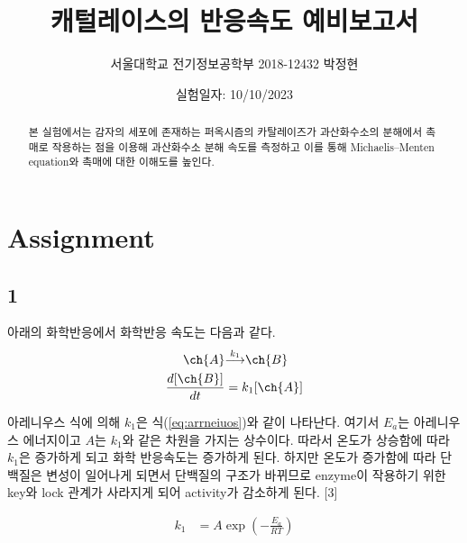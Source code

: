 \documentclass[%
 reprint,
 amsmath,amssymb,
 aps,
]{revtex4-2}
\begin{document}
\title{캐털레이스의 반응속도 예비보고서}

\author{서울대학교 전기정보공학부 2018-12432 박정현}
\date{실험일자: 10/10/2023}%

\begin{abstract}
본 실험에서는 감자의 세포에 존재하는 퍼옥시즘의 카탈레이즈가 과산화수소의 분해에서 촉매로 작용하는 점을 이용해 과산화수소 분해 속도를 측정하고 이를 통해 Michaelis–Menten equation와 촉매에 대한 이해도를 높인다.
\end{abstract}

\maketitle


\section{\label{sec:level1}Assignment}
\subsection{\label{sec:level2} 1}
아래의 화학반응에서 화학반응 속도는 다음과 같다.
\begin{align}
	\ch{A} &{\overset{k_{1}}{\longrightarrow}} \ch{B}\\
	\frac{d[\ch{B}]}{dt} &= k_{1}[\ch{A}]
\end{align}

아레니우스 식에 의해 $k_{1}$은 식(\ref{eq:arrneiuos})와 같이 나타난다. 여기서 $E_{a}$는 아레니우스 에너지이고 $A$는 $k_{1}$와 같은 차원을 가지는 상수이다. 따라서 온도가 상승함에 따라 $k_{1}$은 증가하게 되고 화학 반응속도는 증가하게 된다. 하지만 온도가 증가함에 따라 단백질은 변성이 일어나게 되면서 단백질의 구조가 바뀌므로 enzyme이 작용하기 위한 key와 lock 관계가 사라지게 되어 activity가 감소하게 된다. [3] 

\begin{align}
	k_{1} &= A\exp\left(-\frac{E_{a}}{RT}\right)\label{eq:arrneiuos}
\end{align}
\end{document}
